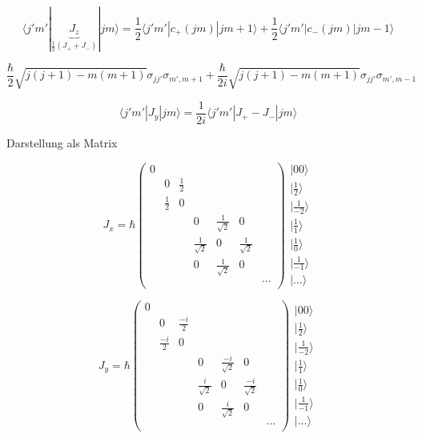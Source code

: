\[\langle j'm'|\underbrace{J_z}_{\frac 1 2(J_++J_-)}|jm\rangle =\frac 1
2\langle j'm'|c_+(jm)|jm+1\rangle +\frac 1 2\langle j'm'|c_-(jm)|jm-1\rangle \]

\[\frac \hbar 2 \sqrt{j(j+1)-m(m+1)}\sigma_{jj'}\sigma_{m',m+1}+\frac {\hbar}{2i}\sqrt{j(j+1)-m(m+1)}\sigma_{jj'}\sigma_{m',m-1}\]

\[\langle j'm'|J_y|jm\rangle =\frac 1 {2i}\langle j'm'|J_+-J_-|jm\rangle \]

Darstellung als Matrix

\[
J_x=\hbar\left(\begin{array}{ccccccc}
0&&&&&&\\
&0&\frac 1 2&&&&\\
&\frac 1 2&0&&&&\\
&&&0&\frac 1 {\sqrt 2}&0&\\
&&&\frac 1 {\sqrt 2}&0&\frac 1 {\sqrt 2}&\\
&&&0&\frac 1 {\sqrt 2}&0&\\
&&&&&&...\\
\end{array}\right)
\begin{array}{c}
|00\rangle \\
|\frac 1 2\rangle \\
|\frac 1 {-2}\rangle \\
|\frac 1 1\rangle \\
|\frac 1 0\rangle \\
|\frac 1 {-1}\rangle \\
|...\rangle 
\end{array}
\]

\[
J_y=\hbar\left(\begin{array}{ccccccc}
0&&&&&&\\
&0&\frac {-i} 2&&&&\\
&\frac {-i} 2&0&&&&\\
&&&0&\frac {-i} {\sqrt 2}&0&\\
&&&\frac {i} {\sqrt 2}&0&\frac {-i} {\sqrt 2}&\\
&&&0&\frac {i} {\sqrt 2}&0&\\
&&&&&&...\\
\end{array}\right)
\begin{array}{c}
|00\rangle \\
|\frac 1 2\rangle \\
|\frac 1 {-2}\rangle \\
|\frac 1 1\rangle \\
|\frac 1 0\rangle \\
|\frac 1 {-1}\rangle \\
|...\rangle 
\end{array}
\]



